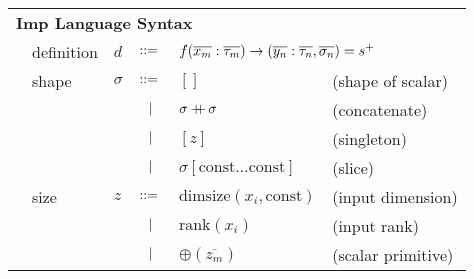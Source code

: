 \documentclass[preprint]{sigplanconf}
\begin{document}
\begin{tabular}{m{0.1cm}m{1.2cm}m{0.1cm}m{0.2cm}p{2cm}p{2.7cm}}
 \multicolumn{6}{l}{\textbf{Imp Language Syntax}} \\[4pt]
& definition        & $d$      & $::=$ & 
      \multicolumn{2}{l}{$f(\overline{x_m} : \overline{\tau_m}) \rightarrow (\overline{y_n} : \overline{\tau_n}, \overline{\sigma_n}) = s^{\small{+}}$} \\[4pt]
& shape             & $\sigma$ & $::=$ & $ [] $                                            &  \quad \small{(shape of scalar)}      \\[2pt]
&                   &          & $\ \ | \ \ $    & $ \sigma +\!\!\!\!+\, \sigma $                         &  \quad \small{(concatenate)}      \\[2pt]
&                   &          & $\ \ | \ \ $    & $ [z] $                                           &  \quad \small{(singleton)}   \\[2pt]
&                   &          & $\ \ | \ \ $    & $ \sigma[\mathrm{const} \ldots  \mathrm{const}] $ &  \quad \small{(slice)}       \\[4pt]
& size              & $z$      & $::=$ & $ \mathrm{dimsize}(x_i, \mathrm{const}) $                  &  \quad \small{(input dimension)}   \\[2pt]
&                   &          & $\ \ | \ \ $    & $ \mathrm{rank}(x_i) $                                     &  \quad \small{(input rank)}  \\[2pt]
&                   &          & $\ \ | \ \ $    & $ \oplus(\overline{z_m})$                         &  \quad \small{(scalar primitive)}    \\[2pt]
\end{tabular}
\end{document}
